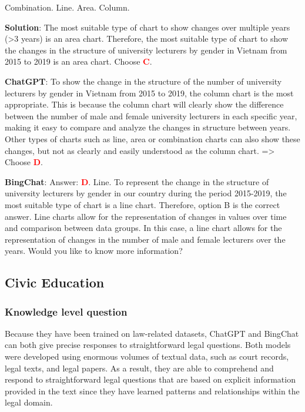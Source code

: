 \documentclass{article}
\begin{document}
{\begin{mdframed}[linewidth=1pt,linecolor=red]
		\begin{oneparchoices}
			\choice Combination.
			\choice Line.
			\choice Area.
			\choice  Column.
		\end{oneparchoices}
		
		\textbf{Solution}: The most suitable type of chart to show changes over multiple years (>3 years) is an area chart.
		Therefore, the most suitable type of chart to show the changes in the structure of university lecturers by gender in Vietnam from 2015 to 2019 is an area chart. Choose \textcolor{red}{\textbf{C}}. 
		
		\textbf{ChatGPT}: To show the change in the structure of the number of university lecturers by gender in Vietnam from 2015 to 2019, the column chart is the most appropriate. This is because the column chart will clearly show the difference between the number of male and female university lecturers in each specific year, making it easy to compare and analyze the changes in structure between years. Other types of charts such as line, area or combination charts can also show these changes, but not as clearly and easily understood as the column chart. => Choose \textcolor{red}{\textbf{D}}. 
		
		\textbf{BingChat}: Answer: \textcolor{red}{\textbf{D}}. Line. To represent the change in the structure of university lecturers by gender in our country during the period 2015-2019, the most suitable type of chart is a line chart. Therefore, option B is the correct answer. Line charts allow for the representation of changes in values over time and comparison between data groups. In this case, a line chart allows for the representation of changes in the number of male and female lecturers over the years. Would you like to know more information?
		
		
	\end{mdframed}	
	
	\subsection{Civic Education}


	\label{VNHSGE_Civ}
	
	\subsubsection{Knowledge level question}
	\label{VNHSGE_Civ_K}
	
	Because they have been trained on law-related datasets, ChatGPT and BingChat can both give precise responses to straightforward legal questions. Both models were developed using enormous volumes of textual data, such as court records, legal texts, and legal papers. As a result, they are able to comprehend and respond to straightforward legal questions that are based on explicit information provided in the text since they have learned patterns and relationships within the legal domain.
	
}
\end{document}
